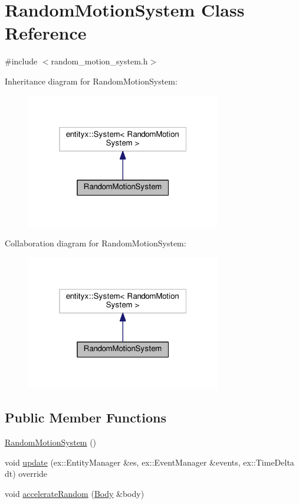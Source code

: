 \hypertarget{classRandomMotionSystem}{}\section{Random\+Motion\+System Class Reference}
\label{classRandomMotionSystem}


{\ttfamily \#include $<$random\+\_\+motion\+\_\+system.\+h$>$}



Inheritance diagram for Random\+Motion\+System\+:
\nopagebreak
\begin{figure}[H]
\begin{center}
\leavevmode
\includegraphics[width=241pt]{classRandomMotionSystem__inherit__graph}
\end{center}
\end{figure}


Collaboration diagram for Random\+Motion\+System\+:
\nopagebreak
\begin{figure}[H]
\begin{center}
\leavevmode
\includegraphics[width=241pt]{classRandomMotionSystem__coll__graph}
\end{center}
\end{figure}
\subsection*{Public Member Functions}
\begin{DoxyCompactItemize}
\item 
\hyperlink{classRandomMotionSystem_aef7a690b419355d36b52ec14d549fab2}{Random\+Motion\+System} ()
\item 
void \hyperlink{classRandomMotionSystem_af76eacfa2fbd4209ec02d77f8ef893d2}{update} (ex\+::\+Entity\+Manager \&es, ex\+::\+Event\+Manager \&events, ex\+::\+Time\+Delta dt) override
\item 
void \hyperlink{classRandomMotionSystem_a001b0eb8bce4321e0e3fbb14b3ba88a1}{accelerate\+Random} (\hyperlink{structBody}{Body} \&body)
\end{DoxyCompactItemize}


